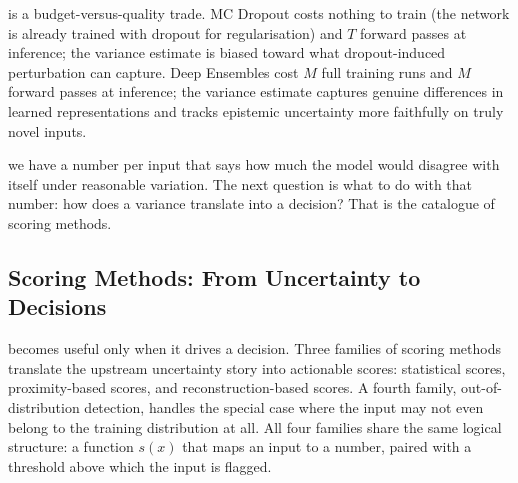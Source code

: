  is a budget-versus-quality trade.
MC Dropout costs nothing to train (the network is already trained with dropout for regularisation) and $T$ forward passes at inference; the variance estimate is biased toward what dropout-induced perturbation can capture.
Deep Ensembles cost $M$ full training runs and $M$ forward passes at inference; the variance estimate captures genuine differences in learned representations and tracks epistemic uncertainty more faithfully on truly novel inputs.



 we have a number per input that says how much the model would disagree with itself under reasonable variation.
The next question is what to do with that number: how does a variance translate into a decision?
That is the catalogue of scoring methods.


\subsection{Scoring Methods: From Uncertainty to Decisions}


 becomes useful only when it drives a decision.
Three families of scoring methods translate the upstream uncertainty story into actionable scores: statistical scores, proximity-based scores, and reconstruction-based scores.
A fourth family, out-of-distribution detection, handles the special case where the input may not even belong to the training distribution at all.
All four families share the same logical structure: a function $s(x)$ that maps an input to a number, paired with a threshold above which the input is flagged.

